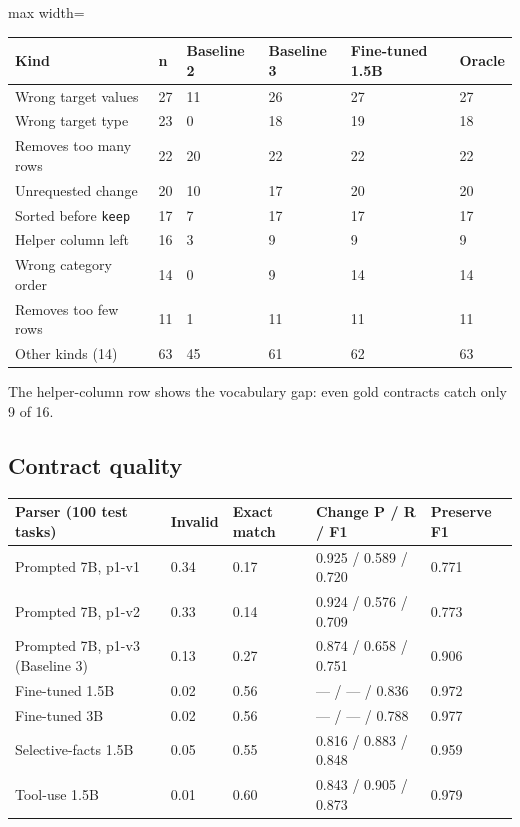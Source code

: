 \documentclass[11pt]{article}
\begin{document}
\begin{table}[!tp]
\centering\footnotesize\setlength{\tabcolsep}{3pt}\renewcommand{\arraystretch}{1.1}
\begin{adjustbox}{max width=\textwidth}\begin{tabular}{llllll}
\toprule
\textbf{Kind} & \textbf{n} & \textbf{Baseline 2} & \textbf{Baseline 3} & \textbf{Fine-tuned 1.5B} & \textbf{Oracle} \\
\midrule
Wrong target values & 27 & 11 & 26 & 27 & 27 \\
Wrong target type & 23 & 0 & 18 & 19 & 18 \\
Removes too many rows & 22 & 20 & 22 & 22 & 22 \\
Unrequested change & 20 & 10 & 17 & 20 & 20 \\
Sorted before \texttt{keep} & 17 & 7 & 17 & 17 & 17 \\
Helper column left & 16 & 3 & 9 & 9 & 9 \\
Wrong category order & 14 & 0 & 9 & 14 & 14 \\
Removes too few rows & 11 & 1 & 11 & 11 & 11 \\
Other kinds (14) & 63 & 45 & 61 & 62 & 63 \\
\bottomrule
\end{tabular}\end{adjustbox}
\end{table}

The helper-column row shows the vocabulary gap: even gold contracts
catch only 9 of 16.

\subsection{Contract quality}

\begin{table}[!tp]
\centering\footnotesize\setlength{\tabcolsep}{3pt}\renewcommand{\arraystretch}{1.1}
\begin{tabularx}{\textwidth}{>{\raggedright\arraybackslash}Xllll}
\toprule
\textbf{Parser (100 test tasks)} & \textbf{Invalid} & \textbf{Exact match} & \textbf{Change P / R / F1} & \textbf{Preserve F1} \\
\midrule
Prompted 7B, p1-v1 & 0.34 & 0.17 & 0.925 / 0.589 / 0.720 & 0.771 \\
Prompted 7B, p1-v2 & 0.33 & 0.14 & 0.924 / 0.576 / 0.709 & 0.773 \\
Prompted 7B, p1-v3 (Baseline 3) & 0.13 & 0.27 & 0.874 / 0.658 / 0.751 & 0.906 \\
Fine-tuned 1.5B & 0.02 & 0.56 & — / — / 0.836 & 0.972 \\
Fine-tuned 3B & 0.02 & 0.56 & — / — / 0.788 & 0.977 \\
Selective-facts 1.5B & 0.05 & 0.55 & 0.816 / 0.883 / 0.848 & 0.959 \\
Tool-use 1.5B & 0.01 & 0.60 & 0.843 / 0.905 / 0.873 & 0.979 \\
\bottomrule
\end{tabularx}
\end{table}
\end{document}
